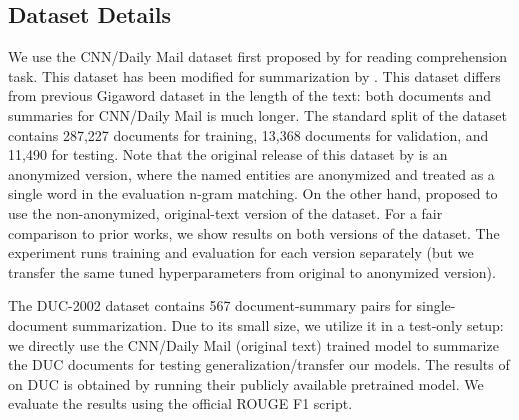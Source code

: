 \documentclass[11pt,a4paper]{article}
\begin{document}
\subsection{Dataset Details}
\label{sec:data}
We use the CNN/Daily Mail dataset first proposed by \citet{nips15_hermann} 
for reading comprehension task.
This dataset has been modified for summarization by \citet{AAAI17:summarunner}.
This dataset differs from previous Gigaword dataset \cite{rush-chopra-weston:2015:EMNLP} in the length of the text: 
both documents and summaries for CNN/Daily Mail is much longer.
The standard split of the dataset contains 287,227 documents for training, 13,368 documents for validation, and 11,490 for testing.
Note that the original release of this dataset by \citet{nips15_hermann} is an anonymized version, where the
named entities are anonymized and treated as a single word in the evaluation n-gram matching.
On the other hand, \citet{get_to_the_point} proposed to use the non-anonymized, original-text version of the dataset.
For a fair comparison to prior works, we show results on both versions of the dataset.
The experiment runs training and evaluation for each version separately (but we transfer the same tuned hyperparameters from original to anonymized version).

The DUC-2002 dataset contains 567 document-summary pairs for single-document summarization. 
Due to its small size, we utilize it in a test-only setup: we directly use the CNN/Daily Mail (original text) trained model to summarize the DUC documents for testing generalization/transfer our models.
The results of \citet{get_to_the_point} on DUC is obtained by running their publicly available pretrained model.
We evaluate the results using the official ROUGE F1 script.
\end{document}
